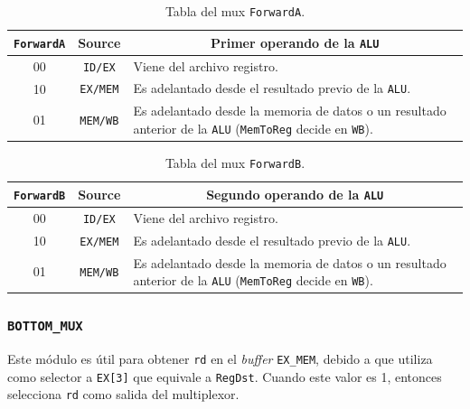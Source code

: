 \documentclass[a4paper]{article}
\begin{document}
\begin{table}[H]
\centering
\begin{tabular}{|c|c|p{7.5cm}|}
\hline
\texttt{ForwardA} & \textbf{Source} & \multicolumn{1}{c|}{\textbf{Primer operando de la \texttt{ALU}}}                    \\ \hline
00 & \texttt{ID/EX}  & Viene del archivo registro.                        \\ \hline
10 & \texttt{EX/MEM} & Es adelantado desde el resultado previo de la \texttt{ALU}. \\ \hline
01                & \texttt{MEM/WB}          & Es adelantado desde la memoria de datos o un resultado anterior de la \texttt{ALU} (\texttt{MemToReg} decide en \texttt{WB}). \\ \hline
\end{tabular}
\caption{Tabla del mux \texttt{ForwardA}.}
\label{tab:forwardA-table}
\end{table}

\begin{table}[H]
\centering
\begin{tabular}{|c|c|p{7.5cm}|}
\hline
\texttt{ForwardB} & \textbf{Source} & \multicolumn{1}{c|}{\textbf{Segundo operando de la \texttt{ALU}}}                   \\ \hline
00 & \texttt{ID/EX}  & Viene del archivo registro.                        \\ \hline
10 & \texttt{EX/MEM} & Es adelantado desde el resultado previo de la \texttt{ALU}. \\ \hline
01                & \texttt{MEM/WB}          & Es adelantado desde la memoria de datos o un resultado anterior de la \texttt{ALU} (\texttt{MemToReg} decide en \texttt{WB}). \\ \hline
\end{tabular}
\caption{Tabla del mux \texttt{ForwardB}.}
\label{tab:forwardB-table}
\end{table}

\subsubsection{\texttt{BOTTOM\_MUX}} \label{sec:bottom}
Este módulo es útil para obtener \texttt{rd} en el \textit{buffer} \texttt{EX\_MEM}, debido a que utiliza como selector a \texttt{EX[3]} que equivale a \texttt{RegDst}. Cuando este valor es 1, entonces selecciona \texttt{rd} como salida del multiplexor.
\end{document}
